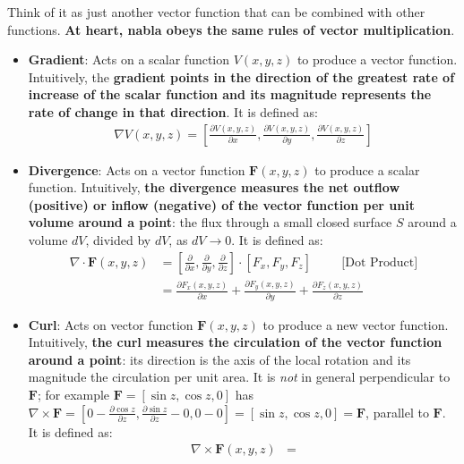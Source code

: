 Think of it as just another vector function that can be combined with other
functions. \textbf{At heart, nabla obeys the same rules of vector
multiplication}.
\begin{itemize}
  \item \textbf{Gradient}: Acts on a scalar function \( V(x, y, z) \) to produce
    a vector function. Intuitively, the \textbf{gradient points in the direction of
    the greatest rate of increase of the scalar function and its magnitude
    represents the rate of change in that direction}. It is defined as:
    \begin{align*}
      \nabla V(x,y,z) = \left[\frac{\partial V(x,y,z)}{\partial x}, \frac{\partial V(x,y,z)}{\partial y}, \frac{\partial V(x,y,z)}{\partial z}\right]
    \end{align*}
  \item \textbf{Divergence}:  Acts on a vector function \( \mathbf{F}(x, y, z) \)
    to produce a scalar function. Intuitively, \textbf{the divergence
    measures the net \textbf{outflow} (positive) or \textbf{inflow} (negative) of the
    vector function per unit volume around a point}: the flux through a
    small closed surface \(S\) around a volume \(dV\), divided by \(dV\), as
    \(dV \to 0\). It is defined as:
    \begin{align*}
      \nabla \cdot \mathbf{F}(x,y,z) &= \left[\frac{\partial}{\partial x}, \frac{\partial}{\partial y}, \frac{\partial}{\partial z}\right] \cdot \left[F_x, F_y, F_z\right] \hspace{1cm} \text{[Dot Product]} \\
      &= \frac{\partial F_x(x,y,z)}{\partial x} +
      \frac{\partial F_y(x,y,z)}{\partial y} +
      \frac{\partial F_z(x,y,z)}{\partial z}
    \end{align*}
  \item \textbf{Curl}: Acts on vector function \( \mathbf{F}(x, y, z) \) to
    produce a new vector function. Intuitively, \textbf{the curl measures the
    circulation of the vector function around a point}: its direction is the
    axis of the local rotation and its magnitude the circulation per unit
    area. It is \emph{not} in general perpendicular to \(\mathbf{F}\); for example
    \(\mathbf{F} = [\sin z, \cos z, 0]\) has
    \(\nabla \times \mathbf{F} = \left[0 - \frac{\partial \cos z}{\partial z}, \frac{\partial \sin z}{\partial z} - 0, 0 - 0\right] = [\sin z, \cos z, 0] = \mathbf{F}\),
    parallel to \(\mathbf{F}\). It is defined as:
    \begin{align*}
      \nabla \times \mathbf{F}(x,y,z) &=

\end{align*}
\end{itemize}

